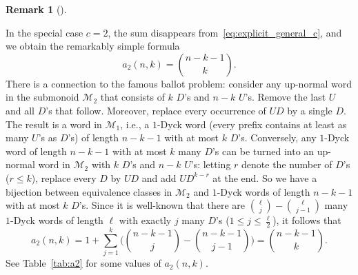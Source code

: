 \documentclass[numbers=enddot,12pt,final,onecolumn,notitlepage]{scrartcl}%
\theoremstyle{definition}
\newtheorem{remk}[theo]{Remark}
\newenvironment{remark}[1][]
{\begin{remk}[#1]\begin{leftbar}}
{\end{leftbar}\end{remk}}
\newcommand{\M}{\mathcal{M}}
\begin{document}

\begin{remark}
In the special case $c=2$, the sum disappears from~\eqref{eq:explicit_general_c}, and we obtain the remarkably simple formula
\[a_2(n,k) = \binom{n-k-1}{k}.\]
There is a connection to the famous ballot problem: consider any up-normal word in the submonoid $\M_2$ that consists of $k$ $D$'s and $n-k$ $U$'s. Remove the last $U$ and all $D$'s that follow. Moreover, replace every occurrence of $UD$ by a single $D$. The result is a word in $\M_1$, i.e., a $1$-Dyck word (every prefix contains at least as many $U$'s as $D$'s) of length $n-k-1$ with at most $k$ $D$'s. Conversely, any $1$-Dyck word of length $n-k-1$ with at most $k$ many $D$'s can be turned into an up-normal word in $\M_2$ with $k$ $D$'s and $n-k$ $U$'s: letting $r$ denote the number of $D$'s ($r \leq k$), replace every $D$ by $UD$ and add $UD^{k-r}$ at the end. So we have a bijection between equivalence classes in $\M_2$ and $1$-Dyck words of length $n-k-1$ with at most $k$ $D$'s. Since it is well-known that there are $\binom{\ell}{j} - \binom{\ell}{j-1}$ many $1$-Dyck words of length $\ell$ with exactly $j$ many $D$'s ($1 \leq j \leq \frac{\ell}2$), it follows that
\[
a_2(n,k) = 1 + \sum_{j=1}^k \Big( \binom{n-k-1}{j} - \binom{n-k-1}{j-1} \Big) = \binom{n-k-1}{k}.
\]
See Table~\ref{tab:a2} for some values of $a_2(n,k)$. %
\end{remark}
\end{document}
